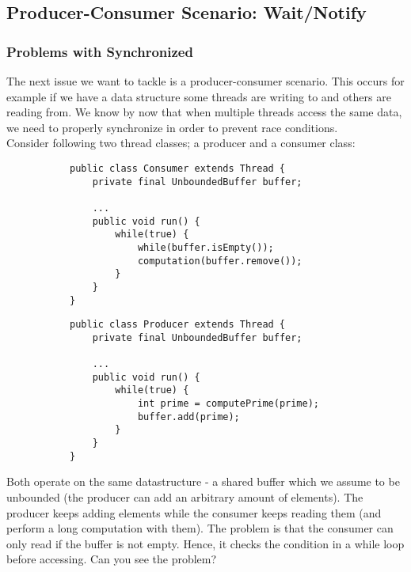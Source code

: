\documentclass[main.tex]{subfiles}
\begin{document}
\subsection{Producer-Consumer Scenario: Wait/Notify}
\subsubsection{Problems with Synchronized}
The next issue we want to tackle is a producer-consumer scenario. This occurs for example if we have a data structure some threads are writing to and others are reading from. We know by now that when multiple threads access the same data, we need to properly synchronize in order to prevent race conditions.\\[3mm]
Consider following two thread classes; a producer and a consumer class:
    \begin{figure}[H]
        \begin{subfigure}{.52\textwidth}
            \begin{verbatim}
public class Consumer extends Thread {
    private final UnboundedBuffer buffer;

    ...
    public void run() {
        while(true) {
            while(buffer.isEmpty());
            computation(buffer.remove());
        }
    }
}
            \end{verbatim}
        \end{subfigure}%
        \begin{subfigure}{.52\textwidth}
            \begin{verbatim}
public class Producer extends Thread {
    private final UnboundedBuffer buffer;

    ...
    public void run() {
        while(true) {
            int prime = computePrime(prime);
            buffer.add(prime);
        }
    }
}
            \end{verbatim}
        \end{subfigure}
    \end{figure}
Both operate on the same datastructure - a shared buffer which we assume to be unbounded (the producer can add an arbitrary amount of elements). The producer keeps adding elements while the consumer keeps reading them (and perform a long computation with them). The problem is that the consumer can only read if the buffer is not empty. Hence, it checks the condition in a while loop before accessing. Can you see the problem?\\[3mm]

\end{document}
